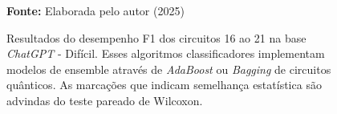 \begin{figure}
\caption{Resultados do desempenho F1 dos circuitos 16 ao 21 na base \textit{ChatGPT} - Difícil. Esses algoritmos classificadores implementam modelos de ensemble através de \textit{AdaBoost} ou \textit{Bagging} de circuitos quânticos. As marcações que indicam semelhança estatística são advindas do teste pareado de Wilcoxon.}
\label{fig:f1:hard:g6}
     \centering
    \centering

      \par\medskip\ABNTEXfontereduzida\selectfont\textbf{Fonte:} Elaborada pelo autor (2025) \par\medskip
\end{figure}
